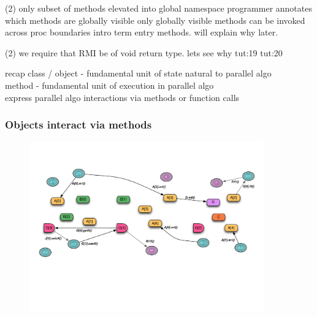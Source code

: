 \begin{frame}
(2) only subset of methods elevated into global namespace
programmer annotates which methods are globally visible
only globally visible methods can be invoked across proc boundaries
intro term entry methods. will explain why later.
\end{frame}


\begin{frame}
(2) we require that RMI be of void return type. lets see why
tut:19
tut:20
\end{frame}


\begin{frame}
recap
    class / object - fundamental unit of state natural to parallel algo\\
    method - fundamental unit of execution in parallel algo\\
    express parallel algo interactions via methods or function calls
\end{frame}


\begin{frame}
  \frametitle{Objects interact via methods}
  \begin{figure}
    \includegraphics[width=0.9\textwidth]{../figures/progmodel/07-algo-via-objects-methods.pdf}
  \end{figure}
\end{frame}



